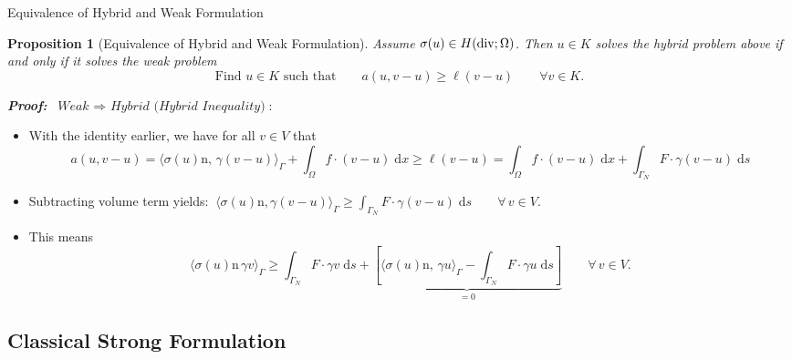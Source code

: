\documentclass[10pt,aspectratio=169]{beamer}
\newtheorem{proposition}{Proposition}[section]
\def\d{{\mathrm{d}}}
\def\dx{{\d x}}
\def\ds{{\d s}}
\newcommand{\diver}{\operatornamewithlimits{div}}
\begin{document}
\begin{frame}{Equivalence of Hybrid and Weak Formulation}
	\begin{proposition}[Equivalence of Hybrid and Weak Formulation]
		Assume $\sigma(u)\in H(\diver;\Omega)$. Then $u\in K$ solves the hybrid problem above if and only if it solves the weak problem
		\begin{equation*}
			\text{Find }u\in K\text{ such that}\qquad a(u,v-u)\ge\ell(v-u)\qquad \forall v\in K.
		\end{equation*}
	\end{proposition}
	\textbf{\em Proof:} $\ \textit{Weak }\Rightarrow\textit{ Hybrid (Hybrid Inequality)}$:
	\begin{itemize}
		\item With the identity earlier, we have for all $v\in V$ that
		      \begin{equation*}
			      a(u,v-u) = \langle \sigma(u)\mathrm{n},\, \gamma(v-u)\rangle_\Gamma + \int_\Omega f\cdot(v-u)\;\dx \ge \ell(v-u)=\int_\Omega f\cdot(v-u)\;\dx +\int_{\Gamma_N}F\cdot\gamma(v-u)\;\ds
		      \end{equation*}
		\item Subtracting volume term yields: $\ \displaystyle  \langle \sigma(u)\mathrm n,\gamma(v-u)\rangle_\Gamma \ge\int_{\Gamma_N}F\cdot\gamma(v-u)\;\ds\qquad \forall\,v\in V$.
		\item This means
		      \begin{equation*}
			      \langle\sigma(u)\mathrm{n}\,\gamma v\rangle_\Gamma\ge \int_{\Gamma_N}F\cdot \gamma v\;\ds + \underbrace{\left[\langle\sigma(u)\mathrm{n},\,\gamma u\rangle_\Gamma-\int_{\Gamma_N}F\cdot\gamma u\;\ds\right]}_{ = 0}\qquad \forall\,v\in V.
		      \end{equation*}
	\end{itemize}
\end{frame}

\subsection{Classical Strong Formulation}
\end{document}
